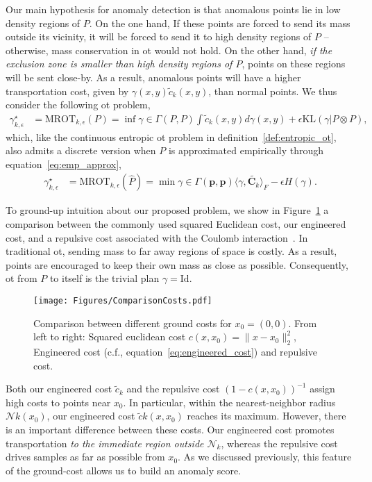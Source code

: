 Our main hypothesis for anomaly detection is that anomalous points lie in low density regions of $P$. On the one hand, If these points are forced to send its mass outside its vicinity, it will be forced to send it to high density regions of $P$ -- otherwise, mass conservation in \gls{ot} would not hold. On the other hand, \emph{if the exclusion zone is smaller than high density regions of $P$}, points on these regions will be sent close-by. As a result, anomalous points will have a higher transportation cost, given by $\gamma(x, y)\tilde{c}_{k}(x, y)$, than normal points. We thus consider the following \gls{ot} problem,
\begin{align}
    \gamma^{\star}_{k,\epsilon} &= \text{MROT}_{k,\epsilon}(P) = \inf{\gamma \in \Gamma(P, P)}\int\tilde{c}_{k}(x,y)d\gamma(x,y)+\epsilon\text{KL}(\gamma|P\otimes P),\label{eq:mrot_continuous}
\end{align}
which, like the continuous entropic \gls{ot} problem in definition~\ref{def:entropic_ot}, also admits a discrete version when $P$ is approximated empirically through equation~\ref{eq:emp_approx},
\begin{align}
    \gamma^{\star}_{k,\epsilon} &= \text{MROT}_{k,\epsilon}(\hat{P}) = \min{\gamma \in \Gamma(\mathbf{p},\mathbf{p})}\langle \gamma, \tilde{\mathbf{C}_{k}}\rangle_{F} - \epsilon H(\gamma).\label{eq:discrete_munot}
\end{align}

To ground-up intuition about our proposed problem, we show in Figure~\ref{fig:comparison-costs} a comparison between the commonly used squared Euclidean cost, our engineered cost, and a repulsive cost associated with the Coulomb interaction~\citep{di2017optimal}. In traditional \gls{ot}, sending mass to far away regions of space is costly. As a result, points are encouraged to keep their own mass as close as possible. Consequently, \gls{ot} from $P$ to itself is the trivial plan $\gamma = \text{Id}$.

\begin{figure}[ht]
    \centering
    \texttt{[image: Figures/ComparisonCosts.pdf]}
    \caption{Comparison between different ground costs for $x_0 = (0, 0)$. From left to right: Squared euclidean cost $c(x, x_0) = \lVert x - x_0 \rVert_{2}^{2}$, Engineered cost (c.f., equation~\ref{eq:engineered_cost}) and repulsive cost.}
    \label{fig:comparison-costs}
\end{figure}

Both our engineered cost $\tilde{c}_{k}$ and the repulsive cost $(1 - c(x, x_0))^{-1}$ assign high costs to points near $x_0$. In particular, within the nearest-neighbor radius $\mathcal{N}{k}(x_0)$, our engineered cost $\tilde{c}{k}(x,x_0)$ reaches its maximum. However, there is an important difference between these costs. Our engineered cost promotes transportation \emph{to the immediate region outside $\mathcal{N}_{k}$}, whereas the repulsive cost drives samples as far as possible from $x_0$. As we discussed previously, this feature of the ground-cost allows us to build an anomaly score.

